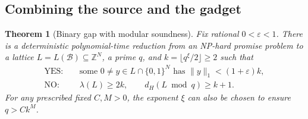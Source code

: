\documentclass[11pt,letterpaper]{article}
\numberwithin{equation}{section}
\newtheorem{theorem}{Theorem}[section]
\theoremstyle{definition}
\theoremstyle{remark}
\newcommand{\Z}{\mathbb Z}
\newcommand{\cB}{\mathcal B}
\newcommand{\YES}{\mathrm{YES}}
\newcommand{\NO}{\mathrm{NO}}
\begin{document}
\subsection{Combining the source and the gadget}
\begin{theorem}[Binary gap with modular soundness]\label{thm:base}
Fix rational $0<\varepsilon<1$. There is a deterministic polynomial-time reduction from an NP-hard promise problem to a lattice $L=L(\cB)\subseteq\Z^N$, a prime $q$, and $k=\lfloor q^\xi/2\rfloor\ge2$ such that
\begin{equation}\label{eq:base-gap}
\begin{aligned}
 \YES:&\quad \text{some }0\ne y\in L\cap\{0,1\}^N
                       \text{ has }\|y\|_1<(1+\varepsilon)k,\\
 \NO:&\quad \lambda(L)\ge2k,\qquad d_H(L\bmod q)\ge k+1.
\end{aligned}
\end{equation}
For any prescribed fixed $C,M>0$, the exponent $\xi$ can also be chosen to ensure $q>Ck^M$.
\end{theorem}
\end{document}
